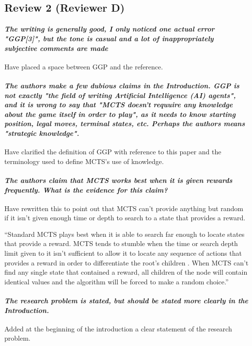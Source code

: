 \documentclass{article}
\begin{document}
\subsection{Review 2 (Reviewer D)}
\paragraph*{\textit{The writing is generally good, I only noticed one actual error "GGP[3]", but the tone is casual and a lot of inappropriately subjective comments are made}}
Have placed a space between GGP and the reference.
\paragraph*{\textit{The authors make a few dubious claims in the Introduction. GGP is not exactly "the field of writing Artificial Intelligence (AI) agents", and it is wrong to say that "MCTS doesn't requuire any knowledge about the game itself in order to play", as it needs to know starting position, legal moves, terminal states, etc. Perhaps the authors means "strategic knowledge". }}
Have clarified the definition of GGP with reference to this paper\cite{genesereth2005general} and the terminology used to define MCTS's use of knowledge.
\paragraph*{\textit{The authors claim that MCTS works best when it is given rewards frequently. What is the evidence for this claim?}}
Have rewritten this to point out that MCTS can't provide anything but random if it isn't given enough time or depth to search to a state that provides a reward.

``Standard MCTS plays best when it is able to search far enough to locate states that provide a reward. MCTS tends to stumble when the time or search depth limit given to it isn't sufficient to allow it to locate any sequence of actions that provides a reward in order to differentiate the root's children \cite{perez2012monte}. When MCTS can't find any single state that contained a reward, all children of the node will contain identical values and the algorithm will be forced to make a random choice.''
\paragraph*{\textit{The research problem is stated, but should be stated more clearly in the Introduction.}}
Added at the beginning of the introduction a clear statement of the research problem.
\end{document}
